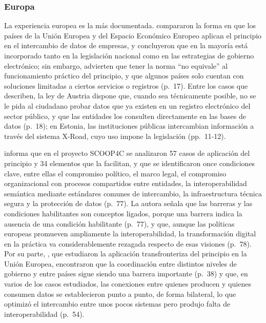 \subsubsection{Europa}

La experiencia europea es la más documentada. \textcite{mamrot2021implementation} compararon la forma en que los países de la Unión Europea y del Espacio Económico Europeo aplican el principio en el intercambio de datos de empresas, y concluyeron que en la mayoría está incorporado tanto en la legislación nacional como en las estrategias de gobierno electrónico; sin embargo, advierten que tener la norma \enquote{no equivale} al funcionamiento práctico del principio, y que algunos países solo cuentan con soluciones limitadas a ciertos servicios o registros (p.~17). Entre los casos que describen, la ley de Austria dispone que, cuando sea técnicamente posible, no se le pida al ciudadano probar datos que ya existen en un registro electrónico del sector público, y que las entidades los consulten directamente en las bases de datos (p.~18); en Estonia, las instituciones públicas intercambian información a través del sistema X-Road, cuyo uso impone la legislación (pp.~11-12).

\textcite{wimmer2021once} informa que en el proyecto SCOOP4C se analizaron 57 casos de aplicación del principio y 34 elementos que la facilitan, y que se identificaron once condiciones clave, entre ellas el compromiso político, el marco legal, el compromiso organizacional con procesos compartidos entre entidades, la interoperabilidad semántica mediante estándares comunes de intercambio, la infraestructura técnica segura y la protección de datos (p.~77). La autora señala que las barreras y las condiciones habilitantes son conceptos ligados, porque una barrera indica la ausencia de una condición habilitante (p.~77), y que, aunque las políticas europeas promueven ampliamente la interoperabilidad, la transformación digital en la práctica va considerablemente rezagada respecto de esas visiones (p.~78). Por su parte, \textcite{leosk2021drivers}, que estudiaron la aplicación transfronteriza del principio en la Unión Europea, encontraron que la coordinación entre distintos niveles de gobierno y entre países sigue siendo una barrera importante (p.~38) y que, en varios de los casos estudiados, las conexiones entre quienes producen y quienes consumen datos se establecieron punto a punto, de forma bilateral, lo que optimizó el intercambio entre unos pocos sistemas pero produjo falta de interoperabilidad (p.~54).

